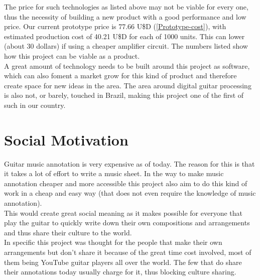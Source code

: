 The price for such technologies as listed above may not be viable for every one,
thus the necessity of building a new product with a good performance and low price.
Our current prototype price is 77.66 U\$D (\autoref{Prototype-cost}), with estimated
production cost of 40.21 U\$D for each of 1000 units. This can lower (about 30 dollars) if using
a cheaper amplifier circuit. The numbers listed show how this project can be viable
as a product. \\
A great amount of technology needs to be built around this project as software, which
can also foment a market grow for this kind of product and therefore create space for
new ideas in the area. The area around digital guitar processing is also not, or barely,
touched in Brazil, making this project one of the first of such in our country.

\section{Social Motivation}
Guitar music annotation is very expensive as of today. The reason for this is that
it takes a lot of effort to write a music sheet. In the way to make music annotation
cheaper and more accessible this project also aim to do this kind of work in a cheap
and easy way (that does not even require the knowledge of music annotation). \\
This would create great social meaning as it makes possible for everyone that play
the guitar to quickly write down their own compositions and arrangements and thus
share their culture to the world. \\
In specific this project was thought for the people that make their own arrangements
but don't share it because of the great time cost involved, most of them being YouTube
guitar players all over the world. The few that do share their annotations today usually
charge for it, thus blocking culture sharing. \\


